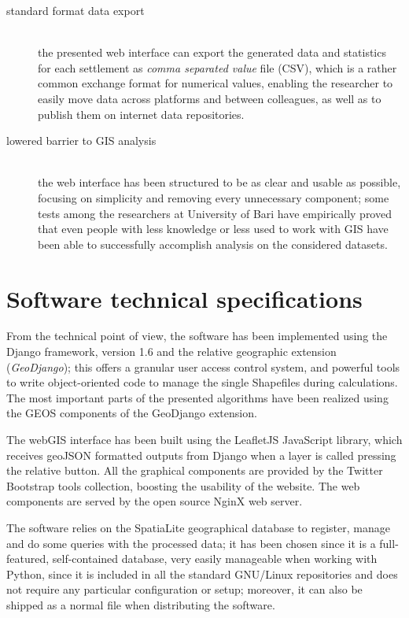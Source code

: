 \begin{description}
                \item[standard format data export]\hfill\\the presented web interface can export the generated data and statistics for each settlement as \emph{comma separated value} file (CSV), which is a rather common exchange format for numerical values, enabling the researcher to easily move data across platforms and between colleagues, as well as to publish them on internet data repositories.
                \item[lowered barrier to GIS analysis]\hfill\\the web interface has been structured to be as clear and usable as possible, focusing on simplicity and removing every unnecessary component; some tests among the researchers at University of Bari have empirically proved that even people with less knowledge or less used to work with GIS have been able to successfully accomplish analysis on the considered datasets.
            \end{description}

        \section{Software technical specifications}
            From the technical point of view, the software has been implemented using the Django framework, version 1.6 and the relative geographic extension (\emph{GeoDjango}); this offers a granular user access control system, and powerful tools to write object-oriented code to manage the single Shapefiles during calculations. The most important parts of the presented algorithms have been realized using the GEOS components of the GeoDjango extension.

            The webGIS interface has been built using the LeafletJS JavaScript library, which receives geoJSON formatted outputs from Django when a layer is called pressing the relative button. All the graphical components are provided by the Twitter Bootstrap tools collection, boosting the usability of the website. The web components are served by the open source NginX web server.
            
            The software relies on the SpatiaLite geographical database to register, manage and do some queries with the processed data; it has been chosen since it is a full-featured, self-contained database, very easily manageable when working with Python, since it is included in all the standard GNU/Linux repositories and does not require any particular configuration or setup; moreover, it can also be shipped as a normal file when distributing the software.

